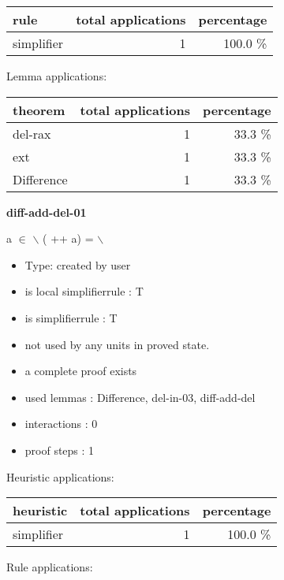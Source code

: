 \documentclass[a4paper]{article}
\begin{document}
\begin{supertabular}{l|r|r}
rule	        & total applications & percentage \\ \hline
simplifier & 1 & 100.0 \% \\

\end{supertabular}

Lemma applications:

\begin{supertabular}{l|r|r}
theorem	        & total applications & percentage \\ \hline
del-rax & 1 & 33.3 \% \\
ext & 1 & 33.3 \% \\
Difference & 1 & 33.3 \% \\

\end{supertabular}
\pagebreak

{\LARGE\bf diff-add-del-01}\label{lemma-diff-add-del-01}

\medskip

 \Fol \Not a $\in$  \Imp {} $\backslash$ ( ++ a) =  $\backslash$ 

\begin{itemize}

\item Type: created by user

\item is local simplifierrule : T
\item is simplifierrule : T
\item not used by any units in proved state.
\item       a complete proof exists
\item       used lemmas  : Difference, del-in-03, diff-add-del
\item       interactions : 0
\item       proof steps  : 1
\end{itemize}

\medskip


Heuristic applications:

\begin{supertabular}{l|r|r}
heuristic	& total applications & percentage \\ \hline
simplifier & 1 & 100.0 \% \\

\end{supertabular}

Rule applications:
\end{document}
